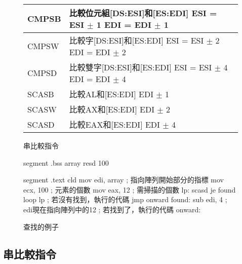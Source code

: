 \begin{figure}[t]
\centering
{\code
\begin{tabular}{|lp{3.5in}|}
\hline CMPSB & 比較位元組[DS:ESI]和[ES:EDI] \newline ESI = ESI $\pm$ 1
        \newline EDI = EDI $\pm$ 1 \\
\hline CMPSW & 比較字[DS:ESI]和[ES:EDI] \newline ESI = ESI $\pm$ 2
        \newline EDI = EDI $\pm$ 2 \\
\hline CMPSD & 比較雙字[DS:ESI]和[ES:EDI] \newline ESI = ESI $\pm$ 4
        \newline EDI = EDI $\pm$ 4 \\
\hline
SCASB & 比較AL和[ES:EDI] \newline EDI $\pm$ 1 \\
\hline
SCASW & 比較AX和[ES:EDI] \newline EDI $\pm$ 2 \\
\hline
SCASD & 比較EAX和[ES:EDI] \newline EDI $\pm$ 4 \\
\hline
\end{tabular}
}
\caption{串比較指令\label{fig:cmpString}
            
          }
\end{figure}

\begin{figure}[t]
\begin{AsmCodeListing}[frame=single,commandchars=\\\{\}]
segment .bss
array        resd 100

segment .text
      cld
      mov    edi, array    ; 指向陣列開始部分的指標
      mov    ecx, 100      ; 元素的個數
      mov    eax, 12       ; 需掃描的個數
lp:
      scasd    \label{line:scasdSrchStrEx}
      je     found
      loop   lp
 ; 若沒有找到，執行的代碼
      jmp    onward
found:
      sub    edi, 4         ; edi現在指向陣列中的12\label{line:subSrchStrEx}
 ; 若找到了，執行的代碼
onward:
\end{AsmCodeListing}
\caption{查找的例子\label{fig:srchStrEx}}
\end{figure}

\subsection{串比較指令}

